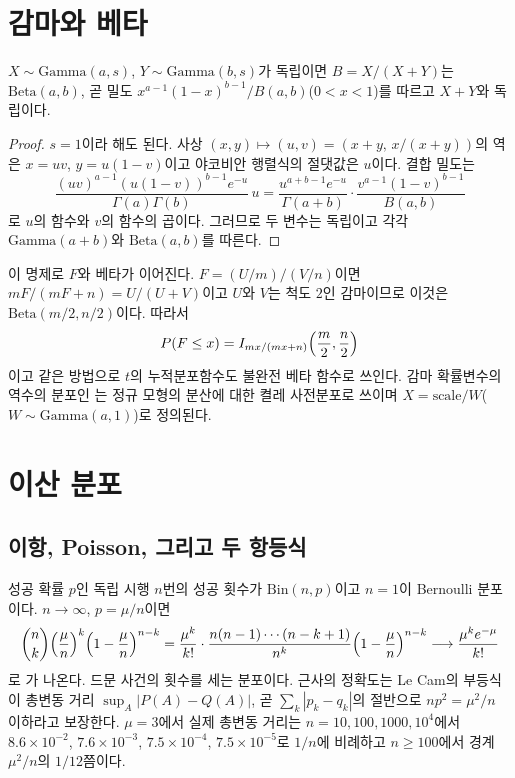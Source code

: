 \section{감마와 베타}
\label{sec:gamma-beta}

\begin{proposition}
\label{prop:gamma-beta}
$X\sim\mathrm{Gamma}(a,s)$, $Y\sim\mathrm{Gamma}(b,s)$가 독립이면 $B=X/(X+Y)$는  $\mathrm{Beta}(a,b)$, 곧 밀도 $x^{a-1}(1-x)^{b-1}/B(a,b)$($0<x<1$)를 따르고 $X+Y$와 독립이다.
\end{proposition}

\begin{proof}
$s=1$이라 해도 된다. 사상 $(x,y)\mapsto(u,v)=(x+y,\,x/(x+y))$의 역은 $x=uv$, $y=u(1-v)$이고 야코비안 행렬식의 절댓값은 $u$이다. 결합 밀도는
\[
\frac{(uv)^{a-1}(u(1-v))^{b-1}e^{-u}}{\Gamma(a)\Gamma(b)}\,u=\frac{u^{a+b-1}e^{-u}}{\Gamma(a+b)}\cdot\frac{v^{a-1}(1-v)^{b-1}}{B(a,b)}
\]
로 $u$의 함수와 $v$의 함수의 곱이다. 그러므로 두 변수는 독립이고 각각 $\mathrm{Gamma}(a+b)$와 $\mathrm{Beta}(a,b)$를 따른다.
\end{proof}

이 명제로 $F$와 베타가 이어진다. $F=(U/m)/(V/n)$이면 $mF/(mF+n)=U/(U+V)$이고 $U$와 $V$는 척도 $2$인 감마이므로 이것은 $\mathrm{Beta}(m/2,n/2)$이다. 따라서
\[
P(F\le x)=I_{mx/(mx+n)}\Bigl(\frac m2,\frac n2\Bigr)
\]
이고 같은 방법으로 $t$의 누적분포함수도 불완전 베타 함수로 쓰인다. 감마 확률변수의 역수의 분포인 는 정규 모형의 분산에 대한 켤레 사전분포로 쓰이며 $X=\text{scale}/W$($W\sim\mathrm{Gamma}(a,1)$)로 정의된다.

\section{이산 분포}
\label{sec:discrete-families}

\subsection{이항, Poisson, 그리고 두 항등식}

성공 확률 $p$인 독립 시행 $n$번의 성공 횟수가  $\mathrm{Bin}(n,p)$이고 $n=1$이 Bernoulli 분포이다. $n\to\infty$, $p=\mu/n$이면
\[
\binom nk\Bigl(\frac\mu n\Bigr)^k\Bigl(1-\frac\mu n\Bigr)^{n-k}=\frac{\mu^k}{k!}\cdot\frac{n(n-1)\cdots(n-k+1)}{n^k}\Bigl(1-\frac\mu n\Bigr)^{n-k}\longrightarrow\frac{\mu^ke^{-\mu}}{k!}
\]
로 가 나온다. 드문 사건의 횟수를 세는 분포이다. 근사의 정확도는 Le Cam의 부등식\cite{lecam1960}이 총변동 거리 $\sup_A|P(A)-Q(A)|$, 곧 $\sum_k|p_k-q_k|$의 절반으로 $np^2=\mu^2/n$ 이하라고 보장한다. $\mu=3$에서 실제 총변동 거리는 $n=10,100,1000,10^4$에서 $8.6\times10^{-2}$, $7.6\times10^{-3}$, $7.5\times10^{-4}$, $7.5\times10^{-5}$로 $1/n$에 비례하고 $n\ge100$에서 경계 $\mu^2/n$의 $1/12$쯤이다.


